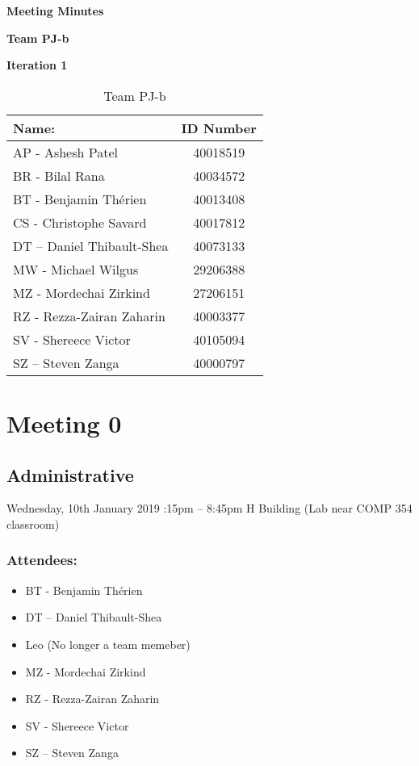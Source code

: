 \documentclass[12pt]{article}
\begin{document}
	
	\vspace*{0.5in}
	\centerline{\bf\Large Meeting Minutes }
	
	\vspace*{0.5in}
	\centerline{\bf\Large Team PJ-b}
	\vspace*{0.25in}
	\centerline{\bf\Large Iteration 1}
	
	
	\vspace*{1.5in}
	\begin{table}[htbp]
		\caption{Team PJ-b}
		\begin{center}
			\begin{tabular}{|l | c|}
				\hline
				Name: & ID Number \\
				\hline
				AP - Ashesh Patel & 40018519 \\
				\hline
				BR - Bilal Rana & 40034572 \\
				\hline
				BT - Benjamin Th\'erien & 40013408 \\
				\hline
				CS - Christophe Savard & 40017812 \\
				\hline
				DT – Daniel Thibault-Shea & 40073133 \\
				\hline
				MW - Michael Wilgus & 29206388 \\
				\hline
				MZ - Mordechai Zirkind & 27206151 \\
				\hline
				RZ - Rezza-Zairan Zaharin & 40003377 \\
				\hline
				SV - Shereece Victor & 40105094 \\
				\hline
				SZ – Steven Zanga & 40000797 \\
				\hline
			\end{tabular}
		\end{center}
	\end{table}
	
	\clearpage
	
	\section{Meeting 0}
	
	\subsection{Administrative}
	Wednesday, 10th January 2019 :15pm – 8:45pm \textbar  H Building (Lab near COMP 354 classroom)  
	\subsubsection{Attendees:}
		\begin{itemize}
		\item BT - Benjamin Th\'erien
		\item DT – Daniel Thibault-Shea
		\item Leo (No longer a team memeber)
		\item MZ - Mordechai Zirkind 
		\item RZ - Rezza-Zairan Zaharin
		\item SV - Shereece Victor
		\item SZ – Steven Zanga
	\end{itemize}
	    
\end{document}

